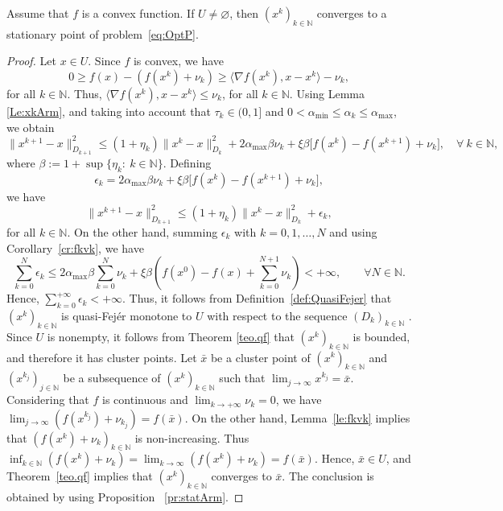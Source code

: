\begin{corollary} \label{cor:xkquasifeArm}
	Assume that $f$ is a convex function. If $U \neq \varnothing$, then $(x^k)_{k\in\mathbb{N}}$ converges to a stationary point of problem~\eqref{eq:OptP}.
\end{corollary}
\begin{proof}
	Let $x \in U$.  Since  $f$ is convex, we have
	$$
		0\geq f(x)-(f(x^k)+\nu_k)\geq \langle \nabla f(x^k),x-x^k\rangle -\nu_k,
	$$
	for all $k\in \mathbb{N}$. Thus, $\langle \nabla f(x^k),x-x^k\rangle\leq \nu_k$, for all $k\in \mathbb{N}$.   Using Lemma \ref{Le:xkArm},  and taking into account  that  $\tau_k \in (0, 1]$  and  $0<\alpha_{\min}\leq \alpha_k \leq \alpha_{\max}$,  we obtain
	{
	$$
		\|x^{k+1}-x\|_{D_{k+1}}^2 \leq (1+\eta_k)\|x^k-x\|_{D_k}^2+2 \alpha_{\max}\beta \nu_k+ \xi \beta \big[f(x^k) - f(x^{k+1}) +\nu_k\big], \quad \forall~k \in \mathbb{N},
	$$
	where $\beta:=1+\sup\{\eta_k:~k\in\mathbb{N}\} $.
	Defining
	$$
		\epsilon_k =  2 \alpha_{\max} \beta \nu_k + \xi \beta\big[f(x^k) - f(x^{k+1}) +\nu_k\big],
	$$
	we have 
	$$
	  \|x^{k+1}-x\|_{D_{k+1}}^2 \leq (1+\eta_k)\|x^k-x\|_{D_k}^2+ \epsilon_k,
	$$
	for all $k \in \mathbb{N}$}. On the other hand, summing $\epsilon_k$ with $k = 0, 1, \ldots, N$ and using  Corollary~\ref{cr:fkvk},  we have
		{
			$$
				\sum_{k=0}^N \epsilon_k \leq 2   \alpha_{\max} \beta \sum_{k=0}^N \nu_k +  \xi \beta\left(f(x^0) - f(x) + \sum_{k=0}^{N+1} \nu_k \right) < +\infty, \qquad \forall N \in \mathbb{N}.
			$$
		}
	Hence, $\sum_{k=0}^{+\infty} \epsilon_k<+\infty$.  Thus, it follows from  Definition~\ref{def:QuasiFejer}  that $(x^k)_{k\in\mathbb{N}}$ is quasi-Fej\'er monotone to $U$ with respect to the sequence  $(D_k)_{k\in\mathbb{N}}$ . Since  $U$ is nonempty, it follows from Theorem \ref{teo.qf} that $(x^k)_{k\in\mathbb{N}}$ is bounded, and therefore it has cluster points. Let $\bar{x}$ be a cluster point of $(x^k)_{k\in\mathbb{N}}$ and $(x^{k_j})_{j\in\mathbb{N}}$ be a subsequence of $(x^k)_{k\in\mathbb{N}}$ such that $\lim_{j \to \infty} x^{k_j} = \bar{x}$. Considering that $f$ is continuous and $\lim_{k\to +\infty} \nu_{k} = 0$, we have $\lim_{j \to \infty} (f(x^{k_j})+\nu_{k_j})= f(\bar{x})$.  On the other hand, Lemma~\ref{le:fkvk} implies that  $\left(f(x^k)+\nu_k\right)_{k\in\mathbb{N}}$ is  non-increasing. Thus  $\inf_{k\in {\mathbb N}}(f(x^{k})+\nu_k)= \lim_{k \to \infty} (f(x^{k})+\nu_{k}) = f(\bar{x}).$ Hence, $\bar{x} \in U$, and  Theorem~\ref{teo.qf}  implies that $(x^k)_{k\in\mathbb{N}}$ converges to $\bar{x}$.  The conclusion is obtained  by  using   Proposition ~\ref{pr:statArm}.
\end{proof}

